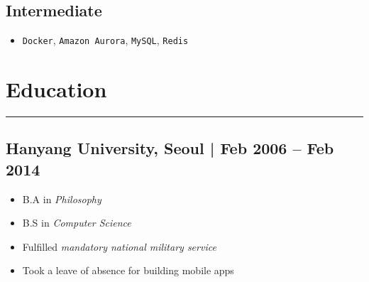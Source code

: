 \documentclass[11pt]{article}
\begin{document}
\subsection*{Intermediate}
\label{sec:orgb502dda}
\begin{itemize}[label=$\circ$,itemsep=-0.5ex]
\item \texttt{Docker}, \texttt{Amazon Aurora}, \texttt{MySQL}, \texttt{Redis}
\end{itemize}

\section*{Education}
\label{sec:orgb920adf}
\vspace{-4ex}

\noindent\rule{\textwidth}{0.5pt}
\vspace{-4ex}

\subsection*{Hanyang University, Seoul | Feb 2006 – Feb 2014}
\label{sec:org2ca0366}
\begin{itemize}[label=$\circ$,itemsep=-0.5ex]
\item B.A in \emph{Philosophy}
\item B.S in \emph{Computer Science}
\item Fulfilled \emph{mandatory national military service}
\item Took a leave of absence for building mobile apps
\end{itemize}
\end{document}
